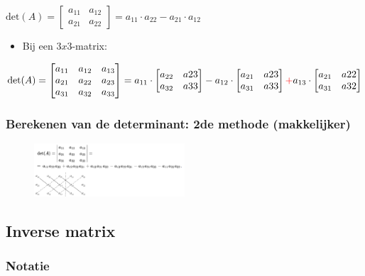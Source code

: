 \documentclass{article}
\begin{document}
$\text{det}(A) = \begin{bmatrix}
a_{11} & a_{12}\\
a_{21} & a_{22}
\end{bmatrix} = a_{11} \cdot a_{22} - a_{21}\cdot a_{12}$

\begin{itemize}
    \item Bij een $3x3$-matrix:
\end{itemize}

$\text{det}(A) = \begin{bmatrix}
a_{11} & a_{12} & a_{13}\\
a_{21} & a_{22} & a_{23}\\
a_{31} & a_{32} & a_{33}
\end{bmatrix} = a_{11} \cdot 
\begin{bmatrix}
a_{22} & a{23}\\
a_{32} & a{33}
\end{bmatrix} - a_{12} \cdot 
\begin{bmatrix}
a_{21} & a{23}\\
a_{31} & a{33}
\end{bmatrix} \textcolor{red}{+}  a_{13} \cdot 
\begin{bmatrix}
a_{21} & a{22}\\
a_{31} & a{32}
\end{bmatrix}
$

\subsubsection{Berekenen van de determinant: 2de methode (makkelijker)}

\begin{figure}[H]
    \centering
    \includegraphics[width=0.5\textwidth]{3x3-matrix-determinant.png}
\end{figure}


\subsection{Inverse matrix}

\subsubsection{Notatie}
\end{document}
